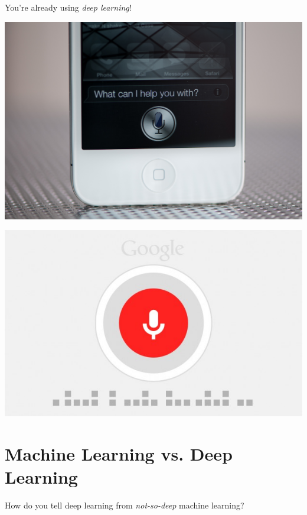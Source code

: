 \documentclass{beamer}
\begin{document}
\begin{frame}{You're already using \emph{deep learning}!}

    \begin{minipage}{0.48\textwidth}
        \centering
        \includegraphics[width=0.9\columnwidth]{siri.jpg}
    \end{minipage}
    \hfill
    \begin{minipage}{0.48\textwidth}
        \centering
        \includegraphics[width=0.9\columnwidth]{googlevoice.jpg}
    \end{minipage}

\end{frame}

\section{Machine Learning vs. Deep Learning}

\begin{frame}
\centering How do you tell deep learning from
\emph{not-so-deep} machine learning?
\end{frame}
\end{document}
